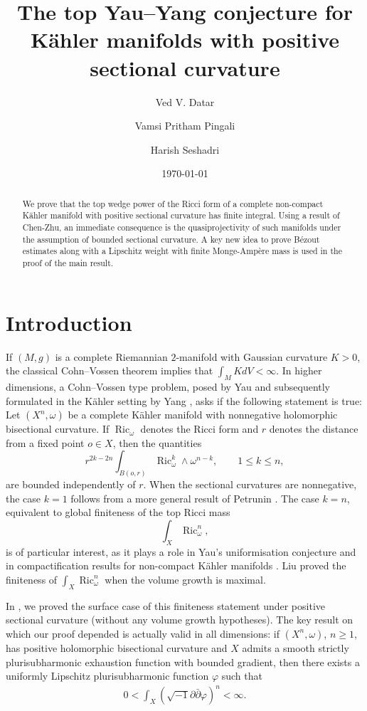 \documentclass[11pt]{amsart}
\title[The top Yau--Yang conjecture]{The top Yau--Yang conjecture for K\"ahler manifolds with positive sectional curvature}
\author[V. Datar]{Ved V. Datar}
\author[V. P. Pingali]{Vamsi Pritham Pingali}
\author[H. Seshadri]{Harish Seshadri}
\date{\today}
\numberwithin{equation}{section}
\newcommand{\ddc}{\sqrt{-1}\partial\bar\partial}
\newcommand{\Ric}{\operatorname{Ric}}
\theoremstyle{plain}
\theoremstyle{remark}
\begin{document}
\begin{abstract}
We prove that the top wedge power of the Ricci form of a complete non-compact K\"ahler manifold with positive sectional curvature has finite integral. Using a result of Chen-Zhu, an immediate consequence is the quasiprojectivity of such manifolds under the assumption of bounded sectional curvature. A key new idea to prove B\'ezout estimates along with a Lipschitz weight with finite Monge-Amp\`ere mass is used in the proof of the main result.
\end{abstract}

\maketitle

\section{Introduction}

If $(M,g)$ is a complete Riemannian $2$-manifold with Gaussian curvature $K > 0$, the classical Cohn--Vossen theorem \cite{CV} implies that $\int_M K dV < \infty$. In higher dimensions, a Cohn--Vossen type problem, posed by Yau \cite{Yau} and subsequently formulated in the K\"ahler setting by Yang \cite{Yang}, asks if the following statement is true: Let $(X^n,\omega)$ be a complete K\"ahler manifold with nonnegative holomorphic bisectional curvature. If $\Ric_{\omega}$ denotes the Ricci form and $r$ denotes the distance from a fixed point $o \in X$, then the quantities
\[
        r^{2k-2n}\int_{B(o,r)}\Ric_{\omega}^k\wedge\omega^{n-k},
        \qquad 1\le k\le n,
\]
are bounded independently of $r$. When the sectional curvatures are nonnegative, the case $k=1$ follows from a more general result of Petrunin \cite{Pet}. The case $k=n$, equivalent to global finiteness of the top Ricci mass
\[
        \int_X \Ric_{\omega}^n,
\]
is of particular interest, as it plays a role in Yau's uniformisation conjecture \cite{CZ2, DPS, DPS2} and in compactification results for non-compact K\"ahler manifolds \cite{Mok90}.   Liu \cite{GL} proved the finiteness of $\int_X \Ric_{\omega}^n$ when the volume growth is maximal.


In \cite{DPS}, we proved the surface case of this finiteness statement under positive sectional curvature (without any volume growth hypotheses). The key result on which our proof depended is actually valid in all dimensions: if $(X^n,\omega)$, $n \ge 1$, has positive holomorphic bisectional curvature and $X$ admits a smooth strictly plurisubharmonic exhaustion function with bounded gradient, then there exists a uniformly Lipschitz plurisubharmonic function $\varphi$ such that
\begin{gather}\label{ineq:finiteMAmassweight}
    0<\displaystyle \int_X (\ddc\varphi)^n<\infty .
\end{gather}
\end{document}
